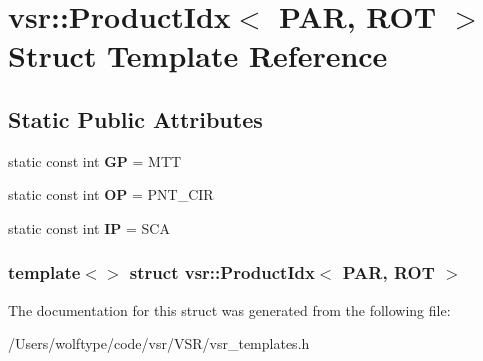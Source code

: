 \hypertarget{structvsr_1_1_product_idx_3_01_p_a_r_00_01_r_o_t_01_4}{\section{vsr\-:\-:Product\-Idx$<$ P\-A\-R, R\-O\-T $>$ Struct Template Reference}
\label{structvsr_1_1_product_idx_3_01_p_a_r_00_01_r_o_t_01_4}
}
\subsection*{Static Public Attributes}
\begin{DoxyCompactItemize}
\item 
\hypertarget{structvsr_1_1_product_idx_3_01_p_a_r_00_01_r_o_t_01_4_a9f49d4755f88a10e91798a4be9103d06}{static const int {\bfseries G\-P} = M\-T\-T}\label{structvsr_1_1_product_idx_3_01_p_a_r_00_01_r_o_t_01_4_a9f49d4755f88a10e91798a4be9103d06}

\item 
\hypertarget{structvsr_1_1_product_idx_3_01_p_a_r_00_01_r_o_t_01_4_acc0c02886f9ab909048b0ffe01620e80}{static const int {\bfseries O\-P} = P\-N\-T\-\_\-\-C\-I\-R}\label{structvsr_1_1_product_idx_3_01_p_a_r_00_01_r_o_t_01_4_acc0c02886f9ab909048b0ffe01620e80}

\item 
\hypertarget{structvsr_1_1_product_idx_3_01_p_a_r_00_01_r_o_t_01_4_add4c1c3934c4ad1878705e36fbf1fa46}{static const int {\bfseries I\-P} = S\-C\-A}\label{structvsr_1_1_product_idx_3_01_p_a_r_00_01_r_o_t_01_4_add4c1c3934c4ad1878705e36fbf1fa46}

\end{DoxyCompactItemize}
\subsubsection*{template$<$$>$ struct vsr\-::\-Product\-Idx$<$ P\-A\-R, R\-O\-T $>$}



The documentation for this struct was generated from the following file\-:\begin{DoxyCompactItemize}
\item 
/\-Users/wolftype/code/vsr/\-V\-S\-R/vsr\-\_\-templates.\-h\end{DoxyCompactItemize}
